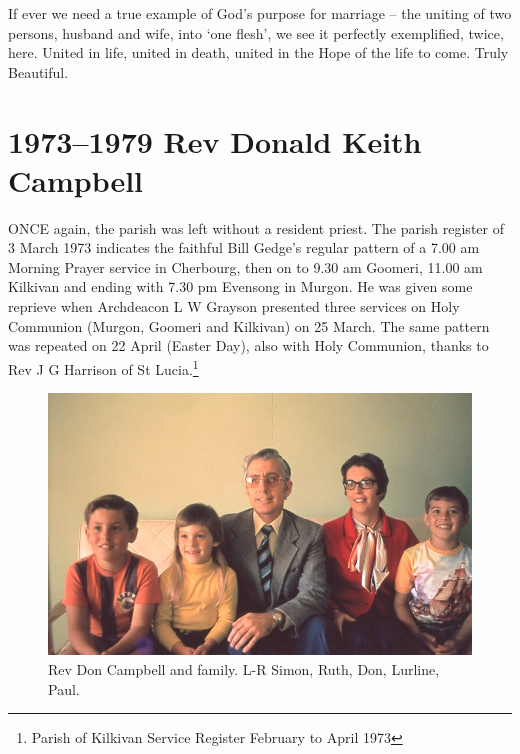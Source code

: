 If ever we need a true example of God's purpose for marriage -- the uniting of two persons, husband and wife, into `one flesh', we see it perfectly exemplified, twice, here. United in life, united in death, united in the Hope of the life to come. Truly Beautiful.



\balance


\printendnotes[custom]
\setcounter{endnote}{0}
\chapter{1973--1979 Rev Donald Keith Campbell}
\nobalance


\lettrine[lines=3]{O}{NCE}
 again, the parish was left without a resident priest. The parish register of 3 March 1973 indicates the faithful Bill Gedge's regular pattern of a 7.00 am Morning Prayer service in Cherbourg, then on to 9.30 am Goomeri, 11.00 am Kilkivan and ending with 7.30 pm Evensong in Murgon. He was given some reprieve when Archdeacon L W Grayson presented three services on Holy Communion (Murgon, Goomeri and Kilkivan) on 25 March. The same pattern was repeated on 22 April (Easter Day), also with Holy Communion, thanks to Rev J G Harrison of St Lucia.\footnote{Parish of Kilkivan Service Register February to April 1973}







\begin{figure}
\begin{center}
\includegraphics[width=1.\linewidth,center]{../images/DonCampbellAndFamily.png}
\caption{Rev Don Campbell and family. L-R Simon, Ruth, Don, Lurline, Paul.}
\end{center}
\end{figure}




